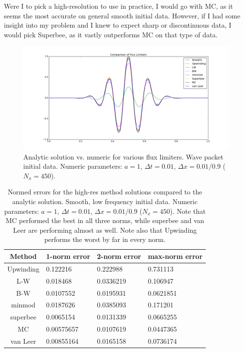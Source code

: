 \documentclass[12pt]{article}
\begin{document}
Were I to pick a high-resolution to use in practice, I would go with MC, as it seems the most accurate on general smooth initial data.  However, if I had some insight into my problem and I knew to expect sharp or discontinuous data, I would pick Superbee, as it vastly outperforms MC on that type of data.

\begin{figure}[H]
\centering\includegraphics[scale=0.42]{wavepacket_fluxcomp.png}
\caption{Analytic solution vs. numeric for various flux limiters. Wave packet initial data. Numeric parameters: $a=1$, $\Delta t = 0.01$, $\Delta x = 0.01/0.9$ ($N_x = 450$).}
\end{figure}

\begin{table}[H]
\centering\begin{tabular}{||c|l|l|l||}
\hline \hline
   Method &   1-norm error &   2-norm error &   max-norm error \\
\hline
        Upwinding &     0.122216   &      0.222988  &        0.731113  \\
        L-W &     0.018468   &      0.0336219 &        0.106947  \\
        B-W &     0.0107552  &      0.0195931 &        0.0621851 \\
        minmod &     0.0187626  &      0.0385093 &        0.171201  \\
        superbee &     0.0065154  &      0.0131339 &        0.0665255 \\
        \color{red}MC & \color{red}0.00575657 & \color{red}0.0107619 & \color{red}0.0447365 \\
        van Leer &     0.00855164 &      0.0165158 &        0.0736174 \\
\hline \hline
\end{tabular}
\caption{Normed errors for the high-res method solutions compared to the analytic solution. Smooth, low frequency initial data. Numeric parameters: $a=1$, $\Delta t = 0.01$, $\Delta x = 0.01/0.9$ ($N_x = 450$). Note that MC performed the best in all three norms, while superbee and van Leer are performing almost as well.  Note also that Upwinding performs the worst by far in every norm.}
\end{table}
\end{document}

